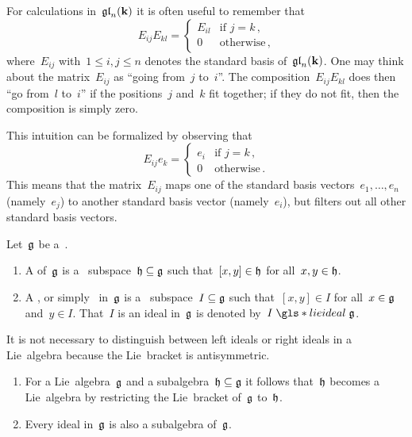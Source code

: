 \begin{recall}
  For calculations in~$\mathfrak{gl}_n(\mathbf{k})$ it is often useful to remember that
  \[
    E_{ij} E_{kl}
    =
    \begin{cases}
      E_{il}  & \text{if~$j = k$} \,, \\
      0       & \text{otherwise}  \,,
    \end{cases}
  \]
  where~$E_{ij}$ with~$1 \leq i,j \leq n$ denotes the standard basis of~$\mathfrak{gl}_n(\mathbf{k})$.
  One may think about the matrix~$E_{ij}$ as \enquote{going from~$j$ to~$i$}.
  The composition~$E_{ij} E_{kl}$ does then \enquote{go from~$l$ to~$i$} if the positions~$j$ and~$k$ fit together;
  if they do not fit, then the composition is simply zero.
  
  This intuition can be formalized by observing that
  \[
    E_{ij} e_k
    =
    \begin{cases}
      e_i & \text{if~$j = k$} \,, \\
      0   & \text{otherwise}  \,.
    \end{cases}
  \]
  This means that the matrix~$E_{ij}$ maps one of the standard basis vectors~$e_1, \dotsc, e_n$ (namely~$e_j$) to another standard basis vector (namely~$e_i$), but filters out all other standard basis vectors.
\end{recall}



\begin{definition}
  Let~$\mathfrak{g}$ be a~{\liealgebra{$\kf$}}.
  \begin{enumerate}
    \item
      A  of~$\mathfrak{g}$ is a~{\linear{$\kf$}} subspace~$\mathfrak{h} \subseteq \mathfrak{g}$ such that~$[x,y] \in \mathfrak{h}$ for all~$x, y \in \mathfrak{h}$.
    \item
      A , or simply~ in~$\mathfrak{g}$ is a~{\linear{$\kf$}} subspace~$I \subseteq \mathfrak{g}$ such that~$[x,y] \in I$ for all~$x \in \mathfrak{g}$ and~$y \in I$.
      That~$I$ is an ideal in~$\mathfrak{g}$ is denoted by~$I \mathrel{\gls*{lie ideal}} \glie$.
  \end{enumerate}
\end{definition}


\begin{remark}
  It is not necessary to distinguish between left ideals or right ideals in a Lie~algebra because the Lie~bracket is antisymmetric.
\end{remark}


\begin{remark}
  \leavevmode
  \begin{enumerate}
    \item
      For a Lie~algebra~$\mathfrak{g}$ and a subalgebra~$\mathfrak{h} \subseteq \mathfrak{g}$ it follows that~$\mathfrak{h}$ becomes a Lie~algebra by restricting the Lie~bracket of~$\mathfrak{g}$ to~$\mathfrak{h}$.
    \item
      Every ideal in~$\mathfrak{g}$ is also a subalgebra of~$\mathfrak{g}$.
  \end{enumerate}
\end{remark}


